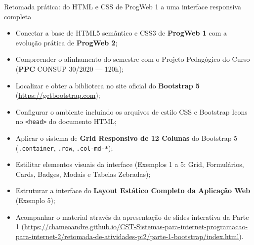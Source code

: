   {Retomada prática: do HTML e CSS de ProgWeb 1 a uma interface responsiva completa}
  {\hspace{4pt}
   \hspace{4pt}
   }

\vspace{0.4em}

\begin{boxObjetivos}
\begin{itemize}
\item Conectar a base de HTML5 semântico e CSS3 de \textbf{ProgWeb 1} com a evolução prática de \textbf{ProgWeb 2};
\item Compreender o alinhamento do semestre com o Projeto Pedagógico do Curso (\textbf{PPC} CONSUP 30/2020 — 120h);
\item Localizar e obter a biblioteca no site oficial do \textbf{Bootstrap 5} (\url{https://getbootstrap.com});
\item Configurar o ambiente incluindo os arquivos de estilo CSS e Bootstrap Icons no \texttt{<head>} do documento HTML;
\item Aplicar o sistema de \textbf{Grid Responsivo de 12 Colunas} do Bootstrap 5 (\texttt{.container}, \texttt{.row}, \texttt{.col-md-*});
\item Estilitar elementos visuais da interface (Exemplos 1 a 5: Grid, Formulários, Cards, Badges, Modais e Tabelas Zebradas);
\item Estruturar a interface do \textbf{Layout Estático Completo da Aplicação Web} (Exemplo 5);
\item Acompanhar o material através da apresentação de slides interativa da Parte 1 (\url{https://chameoandre.github.io/CST-Sistemas-para-internet-programacao-para-internet-2/retomada-de-atividades-pi2/parte-1-bootstrap/index.html}).
\end{itemize}
\end{boxObjetivos}

\begin{mapaAula}
\end{mapaAula}

